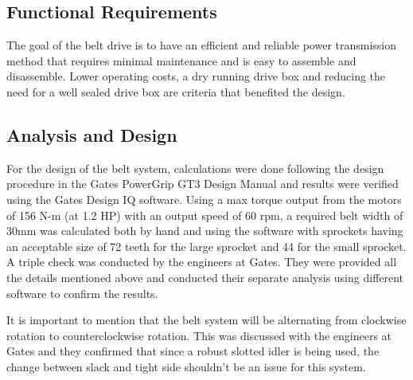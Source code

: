 \subsection{Functional Requirements}
The goal of the belt drive is to have an efficient and reliable power transmission method that requires minimal maintenance and is easy to assemble and disassemble. Lower operating costs, a dry running drive box and reducing the need for a well sealed drive box are criteria that benefited the design.

\subsection{Analysis and Design}
For the design of the belt system, calculations were done following the design procedure in the Gates PowerGrip GT3 Design Manual and results were verified using the Gates Design IQ software. Using a max torque output from the motors of 156 N-m (at 1.2 HP) with an output speed of 60 rpm, a required belt width of 30mm was calculated both by hand and using the software with sprockets having an acceptable size of 72 teeth for the large sprocket and 44 for the small sprocket. A triple check was conducted by the engineers at Gates. They were provided all the details mentioned above and conducted their separate analysis using different software to confirm the results. 

It is important to mention that the belt system will be alternating from clockwise rotation to counterclockwise rotation. This was discussed with the engineers at Gates and they confirmed that since a robust slotted idler is being used, the change between slack and tight side shouldn’t be an issue for this system.